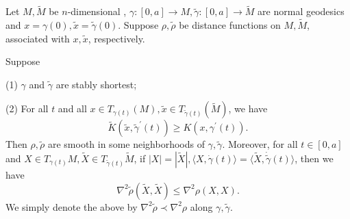 \documentclass{ctexart}
\begin{document}
Let $M, \widetilde{M}$ be $n$-dimensional , $\gamma:[0, a] \rightarrow M, \widetilde{\gamma}:[0, a] \rightarrow \widetilde{M}$ are normal geodesics and $x=\gamma(0), \widetilde{x}=\widetilde{\gamma}(0)$. 
Suppose $\rho, \widetilde{\rho}$ be distance functions on $M, \widetilde{M}$, associated with $x, \widetilde{x}$, respectively. 
\begin{theorem}
  Suppose 

  (1) $\gamma$ and $\widetilde{\gamma}$ are stably shortest; 

  (2) For all $t$ and all $x \in T_{\gamma(t)}(M), \tilde{x} \in T_{\tilde{\gamma}(t)}(\tilde{M})$, we have
  $$
  \tilde{K}\left(\tilde{x}, \tilde{\gamma}^{\prime}(t)\right) \geq K\left(x, \gamma^{\prime}(t)\right). 
  $$
  Then $\rho, \widetilde{\rho}$ are smooth in some neighborhoods of $\gamma, \widetilde{\gamma}$. Moreover, for all $t \in[0, a]$ and $X \in T_{\gamma(t)} M, \tilde{X} \in T_{\widetilde{\gamma}(t)} \widetilde{M}$, 
  if $|X|=|\widetilde{X}|,\langle X, \dot{\gamma}(t)\rangle=\langle\widetilde{X}, \dot{\widetilde{\gamma}}(t)\rangle$, then we have 
  $$
  \nabla^2 \widetilde{\rho}(\widetilde{X}, \widetilde{X}) \leq \nabla^2 \rho(X, X).
  $$
  We simply denote the above by $\nabla^2 \widetilde{\rho} \prec \nabla^2 \rho$ along $\gamma, \widetilde{\gamma}$.  
\end{theorem}
\end{document}

